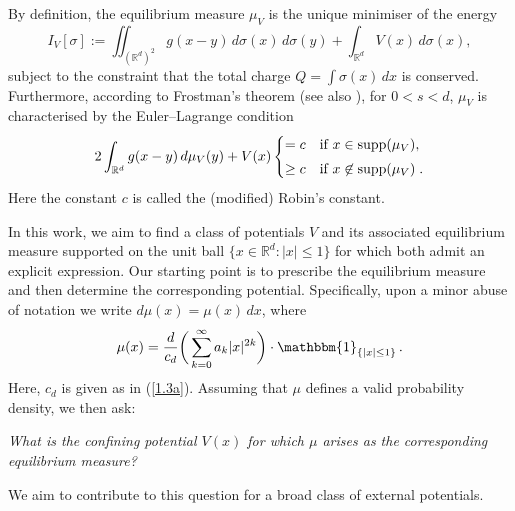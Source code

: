 \documentclass[10pt]{amsart}
\def\R{\mathbb{R}}
\theoremstyle{plain}
\theoremstyle{remark}
\numberwithin{equation}{section}
\begin{document}
By definition, the equilibrium measure $\mu_V$ is the unique minimiser of the energy 
\begin{equation} \label{def of energy functional}
I_V[\sigma] := \iint_{ (\R^d)^2} g(x-y) \,d\sigma(x)\,d\sigma(y) + \int_{ \R^d } V(x)\,d\sigma(x),  
\end{equation}
subject to the constraint that the total charge $Q=\int \sigma(x) \, dx$ is conserved.
Furthermore, according to Frostman's theorem \cite{Fr35} (see also \cite[Theorem~2]{DOSW23}), for $0 < s < d$, $\mu_V$ is characterised by the Euler–Lagrange condition 
\begin{equation} \label{def of EL eqn}
2\int_{ \R^d } g(x-y) \,d\mu_V(y) +V(x) \begin{cases}
= c & \textup{if } x \in \textup{supp}(\mu_V),  
\smallskip 
\\
\ge c & \textup{if } x \not\in \textup{supp}(\mu_V) \;.  
\end{cases} 
\end{equation} 
Here the constant $c$ is called the (modified) Robin's constant.  
 
In this work, we aim to find a class of potentials $V$ and its associated equilibrium measure supported on the unit ball $\{x\in \R^d: |x| \le 1 \}$ for which both admit an explicit expression.
Our starting point is to prescribe the equilibrium measure and then determine the corresponding potential. Specifically, upon a minor abuse of notation we write
$d \mu(x) = \mu(x) \, dx$, where
\begin{equation}\label{def of eq msr mu ak gen d}
\mu(x) = {d \over  c_d} \bigg( \sum_{k=0}^\infty a_k |x|^{2k} \bigg) \cdot  \mathbbm{1}_{ \{ |x| \le 1 \} } \,.
\end{equation}
Here, $c_d$ is given as in  (\ref{1.3a}).
 Assuming that $\mu$ defines a valid probability density, we then ask: 
\smallskip 
\begin{center}
\textit{What is the confining potential $V(x)$ for which $\mu$
arises as the corresponding equilibrium measure?}
\end{center} 
\smallskip 
We aim to contribute to this question for a broad class of external potentials.
\end{document}
